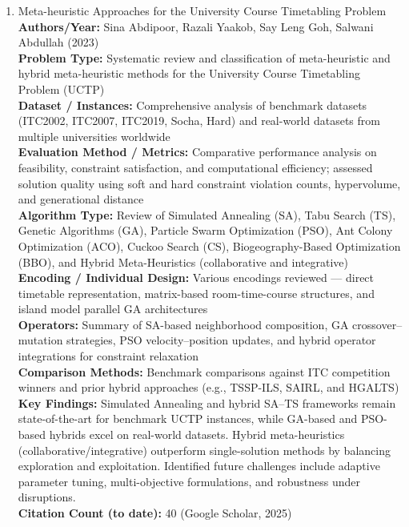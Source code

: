 \documentclass[a4paper,12pt]{article}
\begin{document}
\begin{enumerate}[leftmargin=2em, labelwidth=1em, labelsep=0.5em, itemsep=1ex]
  \item Meta-heuristic Approaches for the University Course Timetabling Problem \\
    \textbf{Authors/Year:} Sina Abdipoor, Razali Yaakob, Say Leng Goh, Salwani Abdullah (2023) \\  
    \textbf{Problem Type:} Systematic review and classification of meta-heuristic and hybrid meta-heuristic methods for the University Course Timetabling Problem (UCTP) \\  
    \textbf{Dataset / Instances:} Comprehensive analysis of benchmark datasets (ITC2002, ITC2007, ITC2019, Socha, Hard) and real-world datasets from multiple universities worldwide \\  
    \textbf{Evaluation Method / Metrics:} Comparative performance analysis on feasibility, constraint satisfaction, and computational efficiency; assessed solution quality using soft and hard constraint violation counts, hypervolume, and generational distance \\  
    \textbf{Algorithm Type:} Review of Simulated Annealing (SA), Tabu Search (TS), Genetic Algorithms (GA), Particle Swarm Optimization (PSO), Ant Colony Optimization (ACO), Cuckoo Search (CS), Biogeography-Based Optimization (BBO), and Hybrid Meta-Heuristics (collaborative and integrative) \\  
    \textbf{Encoding / Individual Design:} Various encodings reviewed — direct timetable representation, matrix-based room-time-course structures, and island model parallel GA architectures \\  
    \textbf{Operators:} Summary of SA-based neighborhood composition, GA crossover–mutation strategies, PSO velocity–position updates, and hybrid operator integrations for constraint relaxation \\  
    \textbf{Comparison Methods:} Benchmark comparisons against ITC competition winners and prior hybrid approaches (e.g., TSSP-ILS, SAIRL, and HGALTS) \\  
    \textbf{Key Findings:} Simulated Annealing and hybrid SA–TS frameworks remain state-of-the-art for benchmark UCTP instances, while GA-based and PSO-based hybrids excel on real-world datasets. Hybrid meta-heuristics (collaborative/integrative) outperform single-solution methods by balancing exploration and exploitation. Identified future challenges include adaptive parameter tuning, multi-objective formulations, and robustness under disruptions. \\  
    \textbf{Citation Count (to date):} 40 (Google Scholar, 2025) \\[2ex]
  


\end{enumerate}
\end{document}
